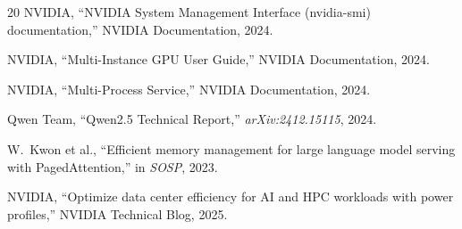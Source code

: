 \documentclass[conference]{IEEEtran}
\begin{document}
\begin{thebibliography}{20}
NVIDIA, ``NVIDIA System Management Interface (nvidia-smi) documentation,'' NVIDIA Documentation, 2024.

NVIDIA, ``Multi-Instance GPU User Guide,'' NVIDIA Documentation, 2024.

NVIDIA, ``Multi-Process Service,'' NVIDIA Documentation, 2024.

Qwen Team, ``Qwen2.5 Technical Report,'' \emph{arXiv:2412.15115}, 2024.

W.~Kwon et al., ``Efficient memory management for large language model serving with PagedAttention,'' in \emph{SOSP}, 2023.

NVIDIA, ``Optimize data center efficiency for AI and HPC workloads with power profiles,'' NVIDIA Technical Blog, 2025.

\end{thebibliography}
\end{document}
